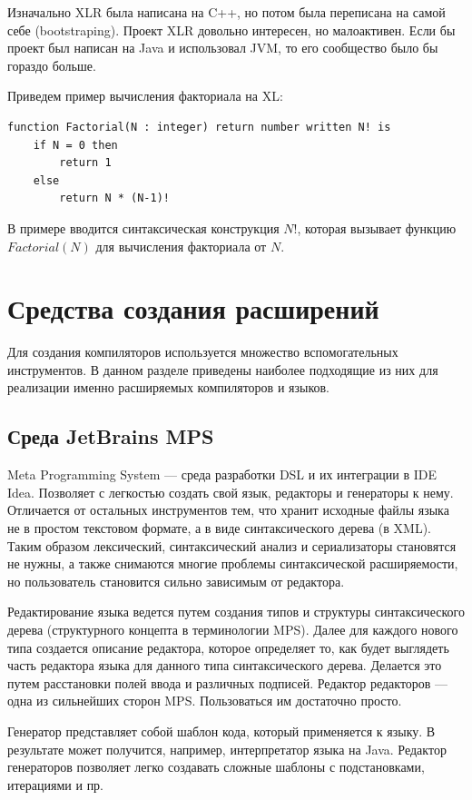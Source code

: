\documentclass[a4paper,12pt,titlepage]{extarticle}
\begin{document}
Изначально XLR была написана на C++, но потом была переписана на самой себе
(bootstraping).
Проект XLR довольно интересен, но малоактивен. Если бы проект был написан на
Java и использовал JVM, то его сообщество было бы гораздо больше.

Приведем пример вычисления факториала на XL:
\begin{verbatim}
function Factorial(N : integer) return number written N! is
    if N = 0 then
        return 1
    else
        return N * (N-1)!
\end{verbatim}
В примере вводится синтаксическая конструкция $N!$, которая вызывает функцию
$Factorial(N)$ для вычисления факториала от $N$.

\section{Средства создания расширений}
\label{tools}

Для создания компиляторов используется множество вспомогательных инструментов. В
данном разделе приведены наиболее подходящие из них для реализации
именно расширяемых компиляторов и языков. 

\subsection{Среда JetBrains MPS}
Meta Programming System --- среда разработки DSL и их интеграции в IDE Idea.
Позволяет с легкостью создать свой язык, редакторы и генераторы к нему.
Отличается от остальных инструментов тем, что хранит исходные файлы языка не в
простом текстовом формате, а в виде синтаксического дерева (в XML).
Таким образом лексический, синтаксический анализ и сериализаторы
становятся не нужны, а также снимаются многие проблемы синтаксической
расширяемости, но пользователь становится сильно зависимым от редактора.

Редактирование языка ведется путем создания типов и структуры синтаксического
дерева (структурного концепта в терминологии MPS). Далее для каждого нового типа
создается описание редактора, которое определяет то, как будет выглядеть часть
редактора языка для данного типа синтаксического дерева. Делается это путем
расстановки полей ввода и различных подписей. Редактор редакторов --- одна из
сильнейших сторон MPS. Пользоваться им достаточно просто.

Генератор представляет собой шаблон кода, который применяется к языку. В
результате может получится, например, интерпретатор языка на Java. Редактор
генераторов позволяет легко создавать сложные шаблоны с подстановками,
итерациями и пр.
\end{document}
